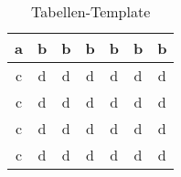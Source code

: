 \begin{table}[ht] %
    \centering
    \caption[Tabellen-Template]{Tabellen-Template} %
    \begin{tabular}[t]{|c||c c c c c c|} %
        \toprule
        a & b & b & b & b & b & b \\
        \hline
        c & d & d & d & d & d & d \\
        c & d & d & d & d & d & d \\
        \cline{2-4} %
        c & d & d & d & d & d & d \\
        c & d & d & d & d & d & d \\
        \bottomrule
    \end{tabular}
    \label{tabel:1} %
\end{table}